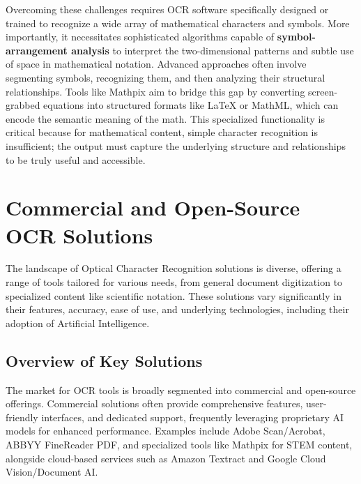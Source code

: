 Overcoming these challenges requires OCR software specifically designed or trained to recognize a wide array of mathematical characters and symbols. More importantly, it necessitates sophisticated algorithms capable of \textbf{symbol-arrangement analysis} to interpret the two-dimensional patterns and subtle use of space in mathematical notation. Advanced approaches often involve segmenting symbols, recognizing them, and then analyzing their structural relationships. Tools like Mathpix aim to bridge this gap by converting screen-grabbed equations into structured formats like LaTeX or MathML, which can encode the semantic meaning of the math. This specialized functionality is critical because for mathematical content, simple character recognition is insufficient; the output must capture the underlying structure and relationships to be truly useful and accessible.

\section{Commercial and Open-Source OCR Solutions}

The landscape of Optical Character Recognition solutions is diverse, offering a range of tools tailored for various needs, from general document digitization to specialized content like scientific notation. These solutions vary significantly in their features, accuracy, ease of use, and underlying technologies, including their adoption of Artificial Intelligence.

\subsection{Overview of Key Solutions}

The market for OCR tools is broadly segmented into commercial and open-source offerings. Commercial solutions often provide comprehensive features, user-friendly interfaces, and dedicated support, frequently leveraging proprietary AI models for enhanced performance. Examples include Adobe Scan/Acrobat, ABBYY FineReader PDF, and specialized tools like Mathpix for STEM content, alongside cloud-based services such as Amazon Textract and Google Cloud Vision/Document AI.

